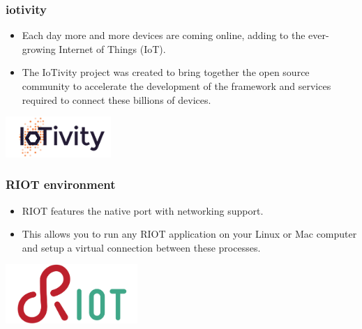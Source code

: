 \documentclass{beamer}
\begin{document}
\begin{frame}
	\frametitle{iotivity}
	\vspace{.1cm}
	\begin{itemize}
		\justifying
		\item Each day more and more devices are coming online, adding to the ever-growing Internet of Things (IoT).
		\item The IoTivity project was created to bring together the open source community to accelerate the development of the framework and services required to connect these billions of devices.
	\end{itemize}
	\vspace{.5cm}
	\hspace*{5.5cm} \includegraphics[width=4cm]{figs/iotivity-logo.png}
\end{frame}

\begin{frame}
	\frametitle{RIOT environment}
	\vspace{.1cm}
	\begin{itemize}
		\justifying
		\item RIOT features the native port with networking support.
		\item This allows you to run any RIOT application on your Linux or Mac computer and setup a virtual connection between these processes.
	\end{itemize}
	\vspace{.5cm}
	\hspace*{5.5cm} \includegraphics[width=5cm]{figs/riot-logo.png}
\end{frame}
\end{document}

